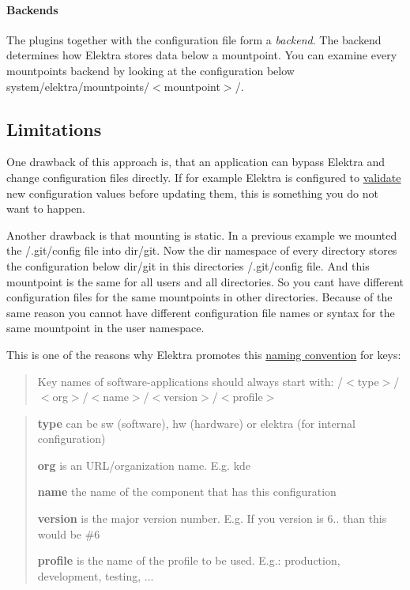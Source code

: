 \paragraph*{Backends}

The plugins together with the configuration file form a {\itshape backend}. The backend determines how Elektra stores data below a mountpoint. You can examine every mountpoints backend by looking at the configuration below {\ttfamily system/elektra/mountpoints/$<$mountpoint$>$/}.

\subsection*{Limitations}

One drawback of this approach is, that an application can bypass Elektra and change configuration files directly. If for example Elektra is configured to \hyperlink{md_doc_tutorials_validation_doc_tutorials_validation_md}{validate} new configuration values before updating them, this is something you do not want to happen.

Another drawback is that mounting is static. In a previous example we mounted the {\ttfamily /.git/config} file into {\ttfamily dir/git}. Now the {\ttfamily dir} namespace of every directory stores the configuration below {\ttfamily dir/git} in this directories {\ttfamily /.git/config} file. And this mountpoint is the same for all users and all directories. So you can\textquotesingle{}t have different configuration files for the same mountpoints in other directories. Because of the same reason you cannot have different configuration file names or syntax for the same mountpoint in the {\ttfamily user} namespace.

This is one of the reasons why Elektra promotes this \hyperlink{md_doc_help_elektra-key-names_doc_help_elektra-key-names_md}{naming convention} for keys\+:

\begin{quote}
Key names of software-\/applications should always start with\+: {\ttfamily /$<$type$>$/$<$org$>$/$<$name$>$/$<$version$>$/$<$profile$>$} \end{quote}


\begin{quote}

\begin{DoxyItemize}
\item {\bfseries type} can be {\ttfamily sw} (software), {\ttfamily hw} (hardware) or {\ttfamily elektra} (for internal configuration)
\item {\bfseries org} is an U\+R\+L/organization name. E.\+g. {\ttfamily kde}
\item {\bfseries name} the name of the component that has this configuration
\item {\bfseries version} is the major version number. E.\+g. If you version is 6.. than this would be {\ttfamily \#6}
\item {\bfseries profile} is the name of the profile to be used. E.\+g.\+: {\ttfamily production}, {\ttfamily development}, {\ttfamily testing}, ... 
\end{DoxyItemize}\end{quote}


